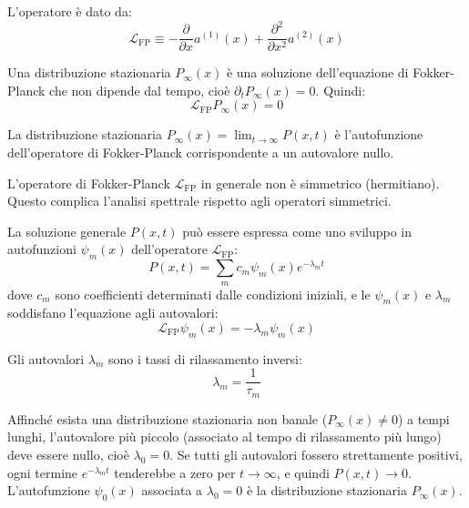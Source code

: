 L'operatore è dato da:
\begin{equation}
\mathcal{L}_{\text{FP}} \equiv -\frac{\partial}{\partial x}a^{(1)}(x) + \frac{\partial^{2}}{\partial x^{2}}a^{(2)}(x)
\end{equation}

Una distribuzione stazionaria $P_{\infty}(x)$ è una soluzione dell'equazione di Fokker-Planck che non dipende dal tempo, cioè $\partial_t P_{\infty}(x) = 0$. Quindi:
\begin{equation}
\mathcal{L}_{\text{FP}}P_{\infty}(x)=0
\end{equation}

\begin{tcolorbox}[
    colback=colorD!5,      
    colframe=colorD,       
    title={Notazione},
    fonttitle=\bfseries\sffamily,
    arc=3mm,               
    boxrule=1.2pt,         
    halign title=flush left
]
La distribuzione stazionaria $P_{\infty}(x) = \lim_{t\rightarrow\infty}P(x,t)$ è l'autofunzione dell'operatore di Fokker-Planck corrispondente a un autovalore nullo.
\end{tcolorbox}

L'operatore di Fokker-Planck $\mathcal{L}_{\text{FP}}$ in generale non è simmetrico (hermitiano). Questo complica l'analisi spettrale rispetto agli operatori simmetrici.

La soluzione generale $P(x,t)$ può essere espressa come uno sviluppo in autofunzioni $\psi_m(x)$ dell'operatore $\mathcal{L}_{\text{FP}}$:
\begin{equation}
P(x,t)=\sum_{m} c_m \psi_{m}(x)e^{-\lambda_{m}t}
\end{equation}
dove $c_m$ sono coefficienti determinati dalle condizioni iniziali, e le $\psi_m(x)$ e $\lambda_m$ soddisfano l'equazione agli autovalori:
\begin{equation}
\mathcal{L}_{\text{FP}}\psi_{m}(x)=-\lambda_{m}\psi_{m}(x)
\end{equation}

Gli autovalori $\lambda_m$ sono i tassi di rilassamento inversi:
\begin{equation} 
\lambda_m = \frac{1}{\tau_m} 
\end{equation}

\begin{tcolorbox}[
    colback=colorD!5,      
    colframe=colorD,       
    title={Importante},
    fonttitle=\bfseries\sffamily,
    arc=3mm,               
    boxrule=1.2pt,         
    halign title=flush left
]
Affinché esista una distribuzione stazionaria non banale ($P_\infty(x) \neq 0$) a tempi lunghi, l'autovalore più piccolo (associato al tempo di rilassamento più lungo) deve essere nullo, cioè $\lambda_0=0$.
Se tutti gli autovalori fossero strettamente positivi, ogni termine $e^{-\lambda_m t}$ tenderebbe a zero per $t\rightarrow\infty$, e quindi $P(x,t)\rightarrow 0$.
L'autofunzione $\psi_0(x)$ associata a $\lambda_0=0$ è la distribuzione stazionaria $P_\infty(x)$.
\end{tcolorbox}

